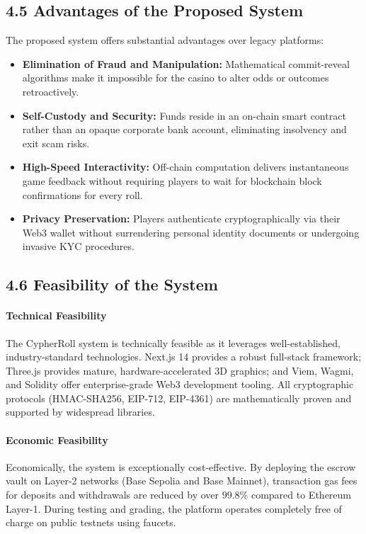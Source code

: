 \subsection*{4.5 Advantages of the Proposed System}
The proposed system offers substantial advantages over legacy platforms:
\begin{itemize}[leftmargin=1.5em]
    \item \textbf{Elimination of Fraud and Manipulation:} Mathematical commit-reveal algorithms make it impossible for the casino to alter odds or outcomes retroactively.
    \item \textbf{Self-Custody and Security:} Funds reside in an on-chain smart contract rather than an opaque corporate bank account, eliminating insolvency and exit scam risks.
    \item \textbf{High-Speed Interactivity:} Off-chain computation delivers instantaneous game feedback without requiring players to wait for blockchain block confirmations for every roll.
    \item \textbf{Privacy Preservation:} Players authenticate cryptographically via their Web3 wallet without surrendering personal identity documents or undergoing invasive KYC procedures.
\end{itemize}

\subsection*{4.6 Feasibility of the System}
\paragraph{Technical Feasibility}
The CypherRoll system is technically feasible as it leverages well-established, industry-standard technologies. Next.js 14 provides a robust full-stack framework; Three.js provides mature, hardware-accelerated 3D graphics; and Viem, Wagmi, and Solidity offer enterprise-grade Web3 development tooling. All cryptographic protocols (HMAC-SHA256, EIP-712, EIP-4361) are mathematically proven and supported by widespread libraries.

\paragraph{Economic Feasibility}
Economically, the system is exceptionally cost-effective. By deploying the escrow vault on Layer-2 networks (Base Sepolia and Base Mainnet), transaction gas fees for deposits and withdrawals are reduced by over $99.8\%$ compared to Ethereum Layer-1. During testing and grading, the platform operates completely free of charge on public testnets using faucets.

